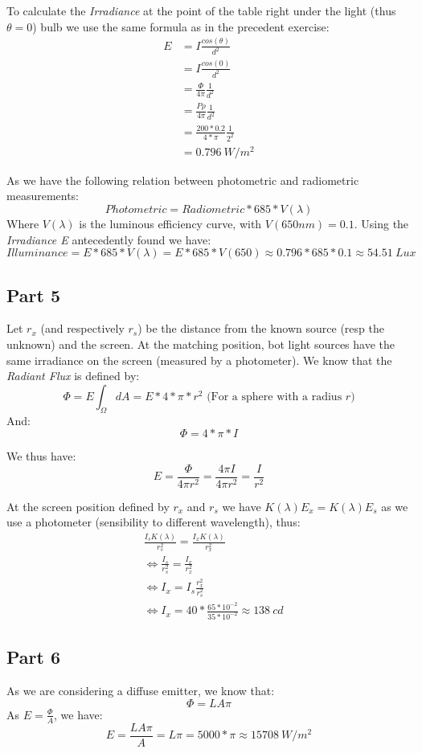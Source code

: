 \documentclass[a4,12pt]{article}
\begin{document}
	To calculate the \textit{Irradiance} at the point of the table right under the light (thus $\theta = 0$) bulb we use the same formula as in the precedent exercise:
	\begin{align*}
		E &= I\frac{cos(\theta)}{d^2}\\
		&= I\frac{cos(0)}{d^2}\\
		&= \frac{\Phi}{4\pi}\frac{1}{d^2}\\
		&= \frac{P\rho}{4\pi}\frac{1}{d^2}\\
		&= \frac{200*0.2}{4*\pi}\frac{1}{2^2}\\
		&= \boxed{0.796\ W/m^2}
	\end{align*}
	
	
	As we have the following relation between photometric and radiometric measurements:
	$$
	Photometric = Radiometric * 685 * V(\lambda)
	$$
	Where $V(\lambda)$ is the luminous efficiency curve, with $V(650nm) = 0.1$. Using the \textit{Irradiance E} antecedently found we have:
	$$
	Illuminance = E * 685 * V(\lambda) = E*685*V(650) \approx 0.796*685*0.1 \approx \boxed{54.51\ Lux}
	$$
	
	\subsection{Part 5}
	Let $r_x$ (and respectively $r_s$) be the distance from the known source (resp the unknown) and the screen. At the matching position, bot light sources have the same irradiance on the screen (measured by a photometer). We know that the \textit{Radiant Flux} is defined by:
	$$
	\Phi = E \int_{\Omega}dA = E*4*\pi*r^2 \text{ (For a sphere with a radius } r \text{)}
	$$
	And:
	$$
	\Phi = 4*\pi*I
	$$
	
	We thus have:
	$$
	E = \frac{\Phi}{4\pi r^2} = \frac{4\pi I}{4\pi r^2} = \frac{I}{r^2}
	$$
	
	At the screen position defined by $r_x$ and $r_s$ we have $K(\lambda)E_x = K(\lambda)E_s$ as we use a photometer (sensibility to different wavelength), thus:
	\begin{align*}
	&\frac{I_s K(\lambda)}{r_s^2} = \frac{I_x K(\lambda)}{r_x^2}\\
	&\iff \frac{I_s}{r_s^2} = \frac{I_x}{r_x^2}\\
	&\iff I_x = I_s \frac{r_x^2}{r_s^2}\\
	&\iff I_x = 40*\frac{65*10^{-2}}{35*10^{-2}} \approx \boxed{138\ cd}
	\end{align*}
	
	\subsection{Part 6}
	As we are considering a diffuse emitter, we know that:
	$$
	\Phi = LA\pi
	$$
	As $E = \frac{\Phi}{A}$, we have:
	$$
	E = \frac{LA\pi}{A} = L\pi = 5000*\pi \approx \boxed{15708\ W/m^2}
	$$
	
\end{document}
